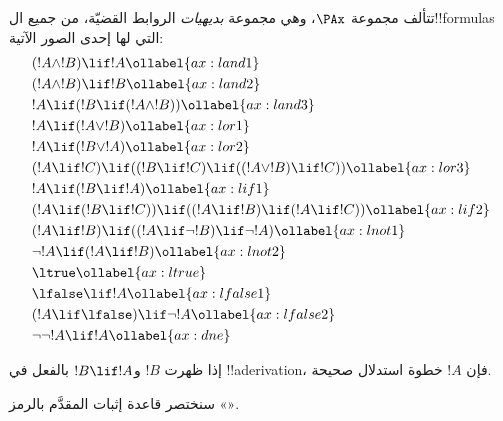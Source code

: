 \documentclass[../../../include/open-logic-section]{subfiles}
\begin{document}
      {}
      {}


\begin{defn}[البديهيات]
تتألف مجموعة $\PAx$، وهي مجموعة \emph{بديهيات} الروابط القضيّة، من جميع
ال!!{formula}s التي لها إحدى الصور الآتية:
\begin{align}
  & (!A \land !B) \lif !A \ollabel{ax:land1}\\
  & (!A \land !B) \lif !B \ollabel{ax:land2}\\
  & !A \lif (!B \lif (!A \land !B)) \ollabel{ax:land3}\\
  & !A \lif (!A \lor !B) \ollabel{ax:lor1}\\
  & !A \lif (!B \lor !A) \ollabel{ax:lor2}\\
  & (!A \lif !C) \lif ((!B \lif !C) \lif ((!A \lor !B) \lif !C)) \ollabel{ax:lor3}\\
  & !A \lif (!B \lif !A) \ollabel{ax:lif1}\\
  & (!A \lif (!B \lif !C)) \lif ((!A \lif !B) \lif (!A \lif !C)) \ollabel{ax:lif2}\\
  & (!A \lif !B) \lif ((!A \lif \lnot !B) \lif \lnot !A) \ollabel{ax:lnot1}\\
  & \lnot !A \lif (!A \lif !B) \ollabel{ax:lnot2}\\
  & \ltrue \ollabel{ax:ltrue}\\
  & \lfalse \lif !A \ollabel{ax:lfalse1}\\
  & (!A \lif \lfalse) \lif \lnot !A \ollabel{ax:lfalse2}\\
  & \lnot\lnot !A \lif !A \ollabel{ax:dne}
\end{align}
\end{defn}

\begin{defn}
  إذا ظهرت $!B$ و$!B \lif !A$ بالفعل في !!a{derivation}، فإن $!A$
  خطوة استدلال صحيحة.
\end{defn}

سنختصر قاعدة إثبات المقدَّم بالرمز «\MP».
\end{document}

